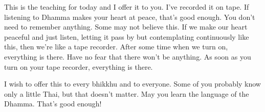 This is the teaching for today and I offer it to you. I've recorded it on tape. If listening to Dhamma makes your heart at peace, that's good enough. You don't need to remember anything. Some may not believe this. If we make our heart peaceful and just listen, letting it pass by but contemplating continuously like this, then we're like a tape recorder. After some time when we turn on, everything is there. Have no fear that there won't be anything. As soon as you turn on your tape recorder, everything is there.

I wish to offer this to every bhikkhu and to everyone. Some of you probably know only a little Thai, but that doesn't matter. May you learn the language of the Dhamma. That's good enough!
